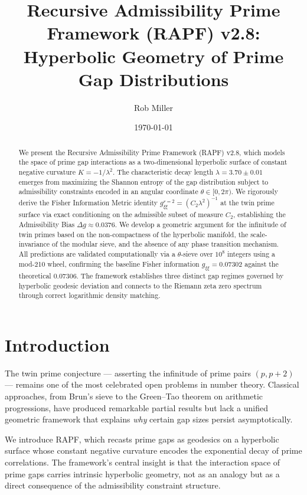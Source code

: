 \documentclass[12pt]{article}
\title{Recursive Admissibility Prime Framework (RAPF) v2.8:\\
Hyperbolic Geometry of Prime Gap Distributions}
\author{Rob Miller}
\date{\today}
\begin{document}
\maketitle

\begin{abstract}
We present the Recursive Admissibility Prime Framework (RAPF) v2.8, which
models the space of prime gap interactions as a two-dimensional hyperbolic
surface of constant negative curvature $K = -1/\lambda^2$. The characteristic
decay length $\lambda = 3.70 \pm 0.01$ emerges from maximizing the Shannon
entropy of the gap distribution subject to admissibility constraints encoded
in an angular coordinate $\theta \in [0, 2\pi)$. We rigorously derive the
Fisher Information Metric identity $g_{\xi\xi}^{r=2} = (C_2 \lambda^2)^{-1}$
at the twin prime surface via exact conditioning on the admissible subset
of measure $C_2$, establishing the Admissibility Bias $\Delta g \approx 0.0376$.
We develop a geometric argument for the infinitude of twin primes based on
the non-compactness of the hyperbolic manifold, the scale-invariance of the
modular sieve, and the absence of any phase transition mechanism. All
predictions are validated computationally via a $\theta$-sieve over $10^8$
integers using a mod-210 wheel, confirming the baseline Fisher information
$g_{\xi\xi} = 0.07302$ against the theoretical $0.07306$. The framework
establishes three distinct gap regimes governed by hyperbolic geodesic
deviation and connects to the Riemann zeta zero spectrum through correct
logarithmic density matching.
\end{abstract}

\tableofcontents
\newpage

\section{Introduction}

The twin prime conjecture --- asserting the infinitude of prime pairs $(p, p+2)$
--- remains one of the most celebrated open problems in number theory. Classical
approaches, from Brun's sieve to the Green--Tao theorem on arithmetic progressions,
have produced remarkable partial results but lack a unified geometric framework that
explains \textit{why} certain gap sizes persist asymptotically.

We introduce RAPF, which recasts prime gaps as geodesics on a hyperbolic surface
whose constant negative curvature encodes the exponential decay of prime
correlations. The framework's central insight is that the interaction space of
prime gaps carries intrinsic hyperbolic geometry, not as an analogy but as a
direct consequence of the admissibility constraint structure.
\end{document}
